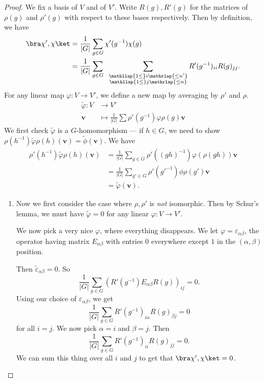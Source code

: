 \documentclass[a4paper]{article}
\begin{document}
\begin{proof}
  We fix a basis of $V$ and of $V'$. Write $R(g), R'(g)$ for the matrices of $\rho(g)$ and $\rho'(g)$ with respect to these bases respectively. Then by definition, we have
  \begin{align*}
    \bra \chi', \chi\ket &= \frac{1}{|G|} \sum_{g \in G} \chi'(g^{-1}) \chi(g)\\
    &= \frac{1}{|G|} \sum_{g \in G}\;\;\sum_{\substack{\mathllap{1 \leq}i\mathrlap{\leq n'}\\ \mathllap{1\leq}j\mathrlap{\leq n}}}R'(g^{-1})_{ii} R(g)_{jj}.
  \end{align*}
  For any linear map $\varphi: V \to V'$, we define a new map by averaging by $\rho'$ and $\rho$.
  \begin{align*}
    \tilde{\varphi}: V &\to V'\\
    \mathbf{v} &\mapsto \frac{1}{|G|} \sum \rho'(g^{-1}) \varphi \rho(g) \mathbf{v}
  \end{align*}
  We first check $\tilde{\varphi}$ is a $G$-homomorphism --- if $h \in G$, we need to show $\rho(h^{-1}) \tilde{\varphi} \rho(h) (\mathbf{v}) = \tilde{\phi}(\mathbf{v})$. We have
  \begin{align*}
    \rho'(h^{-1})\tilde{\varphi}\rho(h) (\mathbf{v}) &= \frac{1}{|G|} \sum_{g \in G} \rho'((gh)^{-1})\varphi(\rho(gh))\mathbf{v}\\
    &= \frac{1}{|G|} \sum_{g' \in G} \rho'(g'^{-1}) \phi \rho(g') \mathbf{v}\\
    &= \tilde{\varphi}(\mathbf{v}).
  \end{align*}
  \begin{enumerate}
    \item Now we first consider the case where $\rho, \rho'$ is \emph{not} isomorphic. Then by Schur's lemma, we must have $\tilde{\varphi} = 0$ for any linear $\varphi: V \to V'$.

      We now pick a very nice $\varphi$, where everything disappears. We let $\varphi = \varepsilon_{\alpha\beta}$, the operator having matrix $E_{\alpha\beta}$ with entries $0$ everywhere except $1$ in the $(\alpha,\beta)$ position.

      Then $\tilde{\varepsilon}_{\alpha\beta} = 0$. So
      \[
        \frac{1}{|G|} \sum_{g \in G} (R'(g^{-1}) E_{\alpha\beta}R(g))_{ij} = 0.
      \]
      Using our choice of $\varepsilon_{\alpha\beta}$, we get
      \[
        \frac{1}{|G|} \sum_{g \in G} R'(g^{-1})_{i\alpha} R(g)_{\beta j} = 0
      \]
      for all $i = j$. We now pick $\alpha = i$ and $\beta = j$. Then
      \[
        \frac{1}{|G|} \sum_{g \in G}R'(g^{-1})_{ii} R(g)_{jj} = 0.
      \]
      We can sum this thing over all $i$ and $j$ to get that $\bra \chi', \chi\ket = 0$.


\end{enumerate}
\end{proof}
\end{document}
